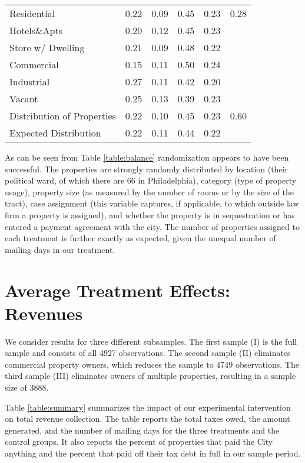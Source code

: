 \documentclass[12pt,titlepage]{article}
\begin{document}
\begin{table}[ht]
\begin{tabular}{|l|c|c|c|c|c|}
Residential & 0.22 & 0.09 & 0.45 & 0.23 & 0.28 \\ 
  Hotels\&Apts & 0.20 & 0.12 & 0.45 & 0.23 &  \\ 
  Store w/ Dwelling & 0.21 & 0.09 & 0.48 & 0.22 &  \\ 
  Commercial & 0.15 & 0.11 & 0.50 & 0.24 &  \\ 
  Industrial & 0.27 & 0.11 & 0.42 & 0.20 &  \\ 
  Vacant & 0.25 & 0.13 & 0.39 & 0.23 &  \\ 
   \hline
Distribution of Properties & 0.22 & 0.10 & 0.45 & 0.23 & 0.60 \\ 
   \hline
Expected Distribution & 0.22 & 0.11 & 0.44 & 0.22 &  \\ 
   \hline
\end{tabular}
\end{table}


As can be seen from Table \ref{table:balance} randomization appears to
have been successful.  The properties are strongly randomly
distributed by location (their political ward, of which there are 66
in Philadelphia), category (type of property usage), property size (as
measured by the number of rooms or by the size of the tract), case
assignment (this variable captures, if applicable, to which outside
law firm a property is assigned), and whether the property is in
sequestration or has entered a payment agreement with the city. The
number of properties assigned to each treatment is further exactly as
expected, given the unequal number of mailing days in our treatment.


\section{Average Treatment Effects: Revenues}


We consider results for three different subsamples.  The first sample
(I) is the full sample and consists of all 4927 observations. The
second sample (II) eliminates commercial property owners, which
reduces the sample to 4749 observations. The third sample (III)
eliminates owners of multiple properties, resulting in a sample size
of 3888.

Table \ref{table:summary} summarizes the impact of our experimental
intervention on total revenue collection.  The table reports the total
taxes owed, the amount generated, and the number of mailing days for
the three treatments and the control groups. It also reports the
percent of properties that paid the City anything and the percent that
paid off their tax debt in full in our sample period.
\end{document}
